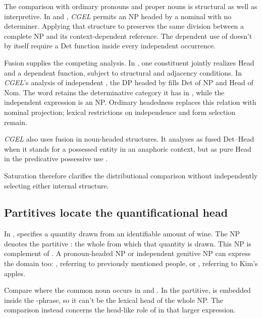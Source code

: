 \documentclass[12pt]{article}
\begin{document}
The comparison with ordinary pronouns and proper nouns is structural as well as interpretive. In  and , \textit{CGEL} permits an NP headed by a nominal with no determiner. Applying that structure to  preserves the same division between a complete NP and its context-dependent reference. The dependent use of  doesn't by itself require a Det function inside every independent occurrence.

Fusion supplies the competing analysis. In \textcite{Payne2007}, one constituent jointly realizes Head and a dependent function, subject to structural and adjacency conditions. In \textit{CGEL}'s analysis of independent , the DP headed by  fills Det of NP and Head of Nom. The word retains the determinative category it has in , while the independent expression is an NP. Ordinary headedness replaces this relation with nominal projection; lexical restrictions on independence and form selection remain.

\textit{CGEL} also uses fusion in noun-headed structures. It analyses  as fused Det--Head when it stands for a possessed entity in an anaphoric context, but as pure Head in the predicative possessive use  \citep[410--411]{huddleston2002}.

Saturation therefore clarifies the distributional comparison without independently selecting either internal structure.

\subsection{Partitives locate the quantificational head}

In ,  specifies a quantity drawn from an identifiable amount of wine. The NP  denotes the partitive : the whole from which that quantity is drawn. This NP is complement of . A pronoun-headed NP or independent genitive NP can express the domain too: , referring to previously mentioned people, or , referring to Kim's apples.

Compare where the common noun occurs in  and . In the partitive,  is embedded inside the -phrase, so it can't be the lexical head of the whole NP. The comparison instead concerns the head-like role of  in that larger expression.
\end{document}

